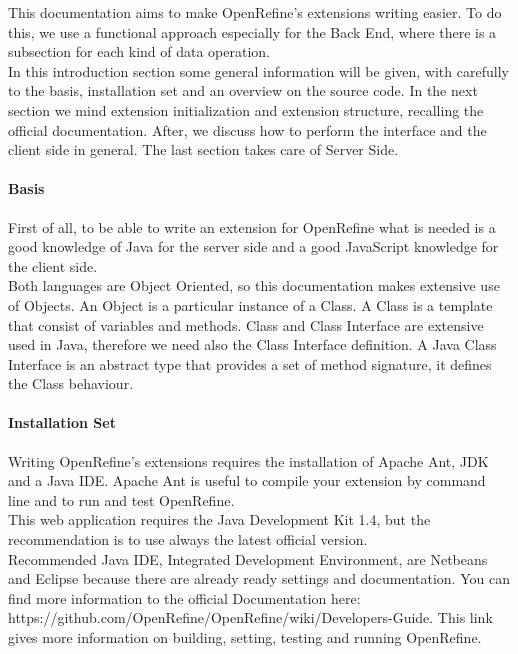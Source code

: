 This documentation aims to make OpenRefine's extensions writing easier. To do this, we use a functional approach especially for the Back End, where there is a subsection for each kind of data operation. \\
In this introduction section some general information will be given, with carefully to the basis, installation set and an overview on the source code. In the next section we mind extension initialization and extension structure, recalling the official documentation. After, we discuss how to perform the interface and the client side in general. The last section takes care of Server Side. 

\paragraph{Basis} First of all, to be able to write an extension for OpenRefine what is needed is a good knowledge of Java for the server side and a good JavaScript knowledge for the client side.\\
Both languages are Object Oriented, so this documentation makes extensive use of Objects. An Object is a particular instance of a Class. A Class is a template that consist of variables and methods. Class and Class Interface are extensive used in Java, therefore we need also the Class Interface definition. A Java Class Interface is an abstract type that provides a set of method signature, it defines the Class behaviour.
 
\paragraph{Installation Set} Writing OpenRefine's extensions requires the installation of Apache Ant, JDK and a Java IDE. Apache Ant is useful to compile your extension by command line and to run and test OpenRefine. \\ 
This web application requires the Java Development Kit 1.4, but the recommendation is to use always the latest official version. \\
Recommended Java IDE, Integrated Development Environment, are Netbeans and Eclipse because there are already ready settings and documentation. You can find more information to the official Documentation here: https://github.com/OpenRefine/OpenRefine/wiki/Developers-Guide. This link gives more information on building, setting, testing and running OpenRefine.

